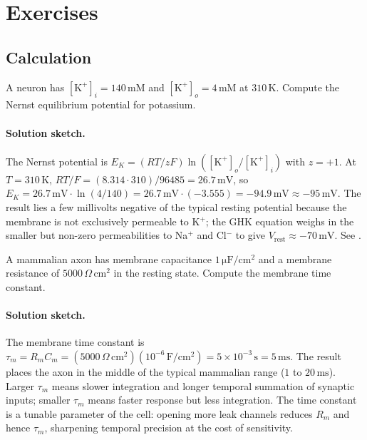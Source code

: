 \section{Exercises}

\subsection*{Calculation}

\begin{exercise}
A neuron has $[\text{K}^+]_i = 140\,\text{mM}$ and
$[\text{K}^+]_o = 4\,\text{mM}$ at $310\,\si{\kelvin}$. Compute the
Nernst equilibrium potential for potassium.
\end{exercise}

\paragraph{Solution sketch.}
The Nernst potential is $E_K = (RT/zF) \ln([\text{K}^+]_o /
[\text{K}^+]_i)$ with $z = +1$. At $T = 310\,\si{\kelvin}$,
$RT/F = (8.314 \cdot 310)/96485 = 26.7\,\text{mV}$, so
$E_K = 26.7\,\text{mV} \cdot \ln(4/140)
= 26.7\,\text{mV} \cdot (-3.555)
= -94.9\,\text{mV} \approx -95\,\text{mV}$. The result lies a few
millivolts negative of the typical resting potential because the
membrane is not exclusively permeable to K$^+$; the GHK equation
weighs in the smaller but non-zero permeabilities to Na$^+$ and
Cl$^-$ to give $V_{\text{rest}} \approx -70\,\text{mV}$. See
\cite[ch.~6]{text:v6c07-kandel-principles-2021}.

\begin{exercise}
A mammalian axon has membrane capacitance $1\,\si{\micro\farad}/\text{cm}^2$
and a membrane resistance of $5000\,\Omega\,\text{cm}^2$ in the resting
state. Compute the membrane time constant.
\end{exercise}

\paragraph{Solution sketch.}
The membrane time constant is $\tau_m = R_m C_m =
(5000\,\Omega\,\text{cm}^2)(10^{-6}\,\text{F}/\text{cm}^2) =
5 \times 10^{-3}\,\text{s} = 5\,\text{ms}$. The result places the
axon in the middle of the typical mammalian range ($1$ to
$20\,\text{ms}$). Larger $\tau_m$ means slower integration and
longer temporal summation of synaptic inputs; smaller $\tau_m$ means
faster response but less integration. The time constant is a tunable
parameter of the cell: opening more leak channels reduces $R_m$ and
hence $\tau_m$, sharpening temporal precision at the cost of
sensitivity.


